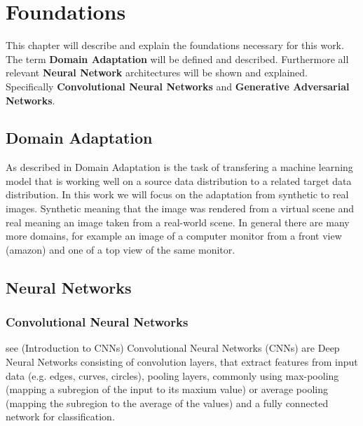 \chapter{Foundations}
\label{sec:foundations}

This chapter will describe and explain the foundations necessary for this work. The term \textbf{Domain Adaptation} will be defined and described. Furthermore all relevant \textbf{Neural Network} architectures will be shown and explained. Specifically \textbf{Convolutional Neural Networks} and \textbf{Generative Adversarial Networks}.


\section{Domain Adaptation}
As described in \cite{DBLP:journals/corr/Csurka17}
Domain Adaptation is the task of transfering a machine learning model that is working well on a source data distribution to a related target data distribution. In this work we will focus on the adaptation from synthetic to real images. Synthetic meaning that the image was rendered from a virtual scene and real meaning an image taken from a real-world scene. In general there are many more domains, for example an image of a computer monitor from a front view (amazon) and one of a top view of the same monitor. 


\section{Neural Networks}

\subsection{Convolutional Neural Networks}
see \cite{wu2017introduction} (Introduction to CNNs)
Convolutional Neural Networks (CNNs) are Deep Neural Networks consisting of convolution layers, that extract features from input data (e.g. edges, curves, circles), pooling layers, commonly using max-pooling (mapping a subregion of the input to its maxium value) or average pooling (mapping the subregion to the average of the values) and a fully connected network for classification. 





